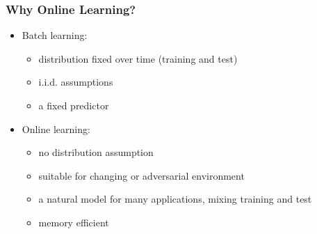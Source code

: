 \documentclass{beamer}
\begin{document}
\begin{frame}
\frametitle{Why Online Learning?}
\begin{itemize}
\item Batch learning:
\begin{itemize}
\item distribution fixed over time (training and test)
\item i.i.d. assumptions
\item a fixed predictor 
\end{itemize}
\pause
\item Online learning:
\begin{itemize}
\item no distribution assumption
\item suitable for changing or adversarial environment  
\item a natural model for many applications, mixing training and test 
\item memory efficient
\end{itemize}
\end{itemize}
\end{frame}
\end{document}
